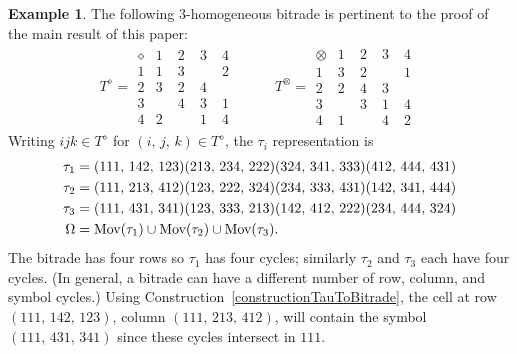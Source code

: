 \documentclass[amstags,fleqn,reqno]{article}
\theoremstyle{plain}
\theoremstyle{definition}
\newtheorem{example}[theorem]{Example}
\newcommand{\darts}{\Omega\xspace}
\newcommand{\opa}{\diamond}
\newcommand{\opb}{\otimes}
\newcommand{\mov}{\textnormal{Mov}}
\begin{document}
\begin{example}\label{ex3hom}
The following $3$-homogeneous bitrade is pertinent to the proof of the
main result of this paper:
\begin{align}
T^{\opa} = \begin{array}{c|cccc}
\opa & 1 & 2 & 3 & 4 \\
\hline 
1 & 1 & 3 & \phantom{-} &2 \\
2 & 3 & 2 & 4 &\phantom{-} \\
3 & \phantom{-} & 4 & 3 &1 \\
4 & 2 & \phantom{-} & 1 &4
\end{array}
& \quad & 
T^{\opb} = \begin{array}{c|cccc}
\opb & 1 & 2 & 3 & 4 \\
\hline 
1 & 3 & 2 &\phantom{-} &1 \\
2 & 2 & 4 &3 &\phantom{-} \\
3 & \phantom{-} & 3 &1 &4 \\
4 & 1 & \phantom{-} &4 &2
\end{array}
\label{eqn3homBitrade}
\end{align}
Writing $ijk \in T^{\opa}$ for
$(i,\, j,\, k) \in T^{\opa}$, the $\tau_i$ representation is
\begin{alignat*}{3}
\tau_1 &=(111,\, 142,\, 123) (213,\, 234,\, 222) (324,\, 341,\, 333) (412,\, 444,\, 431) \\
\tau_2 &=(111,\, 213,\, 412) (123,\, 222,\, 324) (234,\, 333,\, 431) (142,\, 341,\, 444) \notag \\
\tau_3 &=(111,\, 431,\, 341)(123,\, 333,\, 213)(142,\, 412,\,
222)(234,\, 444,\, 324) \notag  \\
\darts &= \mov(\tau_1) \cup \mov(\tau_2) \cup \mov(\tau_3).\notag 
\end{alignat*}
%
%
%
The bitrade has four rows so $\tau_1$ has four cycles; 
similarly $\tau_2$ and $\tau_3$ each have four cycles. (In general,
a bitrade can have a different number of row, column, and
symbol cycles.)
Using Construction~\ref{constructionTauToBitrade},
the cell at row $(111,\, 142,\, 123)$,
column $(111,\, 213,\, 412)$, will contain the symbol
$(111,\, 431,\, 341)$ since these cycles intersect in $111$. 
\end{example}
\end{document}
